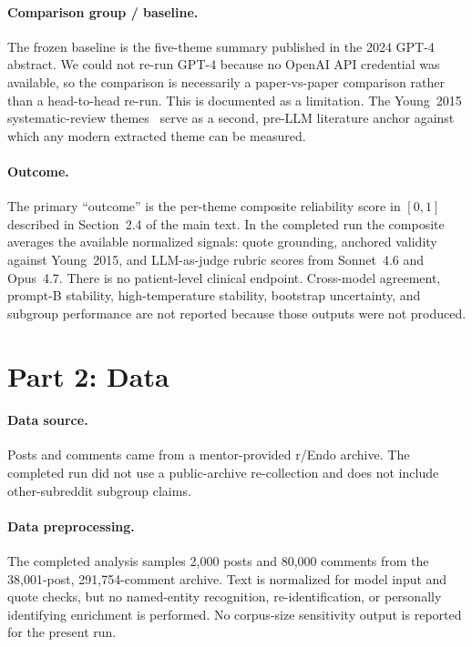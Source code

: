\documentclass[11pt]{article}
\begin{document}
\paragraph{Comparison group / baseline.}
The frozen baseline is the five-theme summary published in the 2024
GPT-4 abstract. We could not re-run GPT-4 because no OpenAI API
credential was available, so the comparison is necessarily a paper-vs-paper
comparison rather than a head-to-head re-run. This is documented as a
limitation. The Young~2015 systematic-review themes~\cite{young2015}
serve as a second, pre-LLM literature anchor against which any modern
extracted theme can be measured.

\paragraph{Outcome.}
The primary ``outcome'' is the per-theme composite reliability score in
$[0, 1]$ described in Section~2.4 of the main text. In the completed run
the composite averages the available normalized signals: quote
grounding, anchored validity against Young~2015, and LLM-as-judge
rubric scores from Sonnet~4.6 and Opus~4.7. There is no patient-level
clinical endpoint. Cross-model agreement, prompt-B stability,
high-temperature stability, bootstrap uncertainty, and subgroup
performance are not reported because those outputs were not produced.

\section*{Part 2: Data}

\paragraph{Data source.}
Posts and comments came from a mentor-provided r/Endo archive. The
completed run did not use a public-archive re-collection and does not
include other-subreddit subgroup claims.

\paragraph{Data preprocessing.}
The completed analysis samples 2{,}000 posts and 80{,}000 comments from
the 38{,}001-post, 291{,}754-comment archive. Text is normalized for
model input and quote checks, but no named-entity recognition,
re-identification, or personally identifying enrichment is performed.
No corpus-size sensitivity output is reported for the present run.
\end{document}
